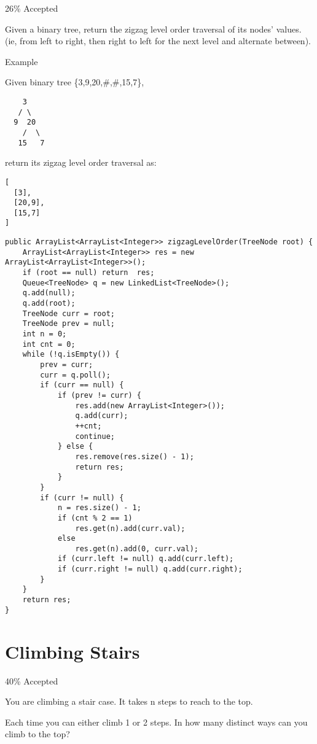 \documentclass[12pt]{book}
\begin{document}
26\% Accepted

Given a binary tree, return the zigzag level order traversal of its nodes' values. (ie, from left to right, then right to left for the next level and alternate between).

Example

Given binary tree \{3,9,20,\#,\#,15,7\},
\lstset{language=java,label= ,caption= ,numbers=none}
\begin{lstlisting}
    3
   / \
  9  20
    /  \
   15   7
\end{lstlisting}

return its zigzag level order traversal as:
\lstset{language=java,label= ,caption= ,numbers=none}
\begin{lstlisting}
[
  [3],
  [20,9],
  [15,7]
]
\end{lstlisting}
\lstset{language=java,label= ,caption= ,numbers=none}
\begin{lstlisting}
public ArrayList<ArrayList<Integer>> zigzagLevelOrder(TreeNode root) {
    ArrayList<ArrayList<Integer>> res = new ArrayList<ArrayList<Integer>>();
    if (root == null) return  res;
    Queue<TreeNode> q = new LinkedList<TreeNode>();
    q.add(null);
    q.add(root);
    TreeNode curr = root;
    TreeNode prev = null;
    int n = 0;
    int cnt = 0;
    while (!q.isEmpty()) {
        prev = curr;
        curr = q.poll();
        if (curr == null) {
            if (prev != curr) {
                res.add(new ArrayList<Integer>());
                q.add(curr);
                ++cnt;
                continue;
            } else {
                res.remove(res.size() - 1);
                return res;   
            }
        }
        if (curr != null) {
            n = res.size() - 1;
            if (cnt % 2 == 1)
                res.get(n).add(curr.val);
            else
                res.get(n).add(0, curr.val);
            if (curr.left != null) q.add(curr.left);
            if (curr.right != null) q.add(curr.right);
        }
    }
    return res;
}
\end{lstlisting}
\chapter{Climbing Stairs}
\label{sec-19}

40\% Accepted

You are climbing a stair case. It takes n steps to reach to the top.

Each time you can either climb 1 or 2 steps. In how many distinct ways can you climb to the top?
\end{document}
